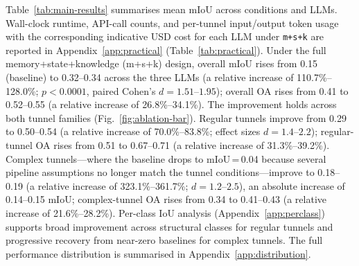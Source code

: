 \documentclass[a4paper,fleqn]{cas-dc}
\begin{document}
{Table~\ref{tab:main-results} summarises mean mIoU across conditions and LLMs. Wall-clock runtime, API-call counts, and per-tunnel input/output token usage with the corresponding indicative USD cost for each LLM under \texttt{m+s+k} are reported in Appendix~\ref{app:practical} (Table~\ref{tab:practical}). Under the full memory+state+knowledge (m+s+k) design, overall mIoU rises from 0.15 (baseline) to 0.32--0.34 across the three LLMs (a relative increase of 110.7\%--128.0\%; $p < 0.0001$, paired Cohen's $d = 1.51$--$1.95$); overall OA rises from 0.41 to 0.52--0.55 (a relative increase of 26.8\%--34.1\%). The improvement holds across both tunnel families (Fig.~\ref{fig:ablation-bar}). Regular tunnels improve from 0.29 to 0.50--0.54 (a relative increase of 70.0\%--83.8\%; effect sizes $d = 1.4$--$2.2$); regular-tunnel OA rises from 0.51 to 0.67--0.71 (a relative increase of 31.3\%--39.2\%). Complex tunnels---where the baseline drops to mIoU\,=\,0.04 because several pipeline assumptions no longer match the tunnel conditions---improve to 0.18--0.19 (a relative increase of 323.1\%--361.7\%; $d = 1.2$--$2.5$), an absolute increase of 0.14--0.15 mIoU; complex-tunnel OA rises from 0.34 to 0.41--0.43 (a relative increase of 21.6\%--28.2\%). Per-class IoU analysis (Appendix~\ref{app:perclass}) supports broad improvement across structural classes for regular tunnels and progressive recovery from near-zero baselines for complex tunnels.  The full performance distribution is summarised in Appendix~\ref{app:distribution}.

}
\end{document}
